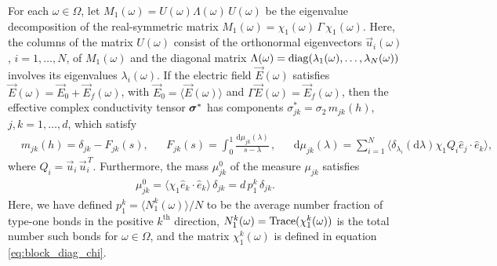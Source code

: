 \documentclass{cmslatex}
\renewcommand{\d}{\text{d}}
\newcommand\bsig{\mbox{\boldmath${\sigma}$}}
\begin{document}
\vspace{0.15in}
% 
\begin{theorem}\label{thm:Discrete_Spectral_Theorem_ACM}
  For each $\omega\in\Omega$, let $M_1(\omega)=U(\omega)\Lambda(\omega)\,U(\omega)$ be the eigenvalue
  decomposition of the real-symmetric matrix
  $M_1(\omega)=\chi_1(\omega)\,\Gamma\,\chi_1(\omega)$. Here, the columns of the matrix $U(\omega)$
  consist of the orthonormal eigenvectors $\vec{u}_i(\omega)$, $i=1,\ldots,N$,
  of $M_1(\omega)$ and the diagonal matrix $\Lambda(\omega)={\rm diag}(\lambda_1(\omega),\ldots,\lambda_N(\omega))$
  involves its eigenvalues $\lambda_i(\omega)$. If the electric field
  $\vec{E}(\omega)$ satisfies $\vec{E}(\omega)=\vec{E}_0+\vec{E}_f(\omega)$, with
  $\vec{E}_0=\langle\vec{E}(\omega)\rangle$ and $\Gamma\vec{E}(\omega)=\vec{E}_f(\omega)$, then the
  effective complex conductivity tensor $\bsig^*$ has components
  $\sigma_{jk}^*=\sigma_2\,m_{jk}(h)$, $j,k=1,\ldots,d$,  which satisfy       
%
\begin{align}\label{eq:Stieltjes_F_Discrete}
  &m_{jk}(h)=\delta_{jk}-F_{jk}(s), 
  &&F_{jk}(s)=\int_0^1\frac{\d\mu_{jk}(\lambda)}{s-\lambda}\,, 
  &&\d\mu_{jk}(\lambda)=\sum_{i=1}^N\langle \delta_{\lambda_i}(\d\lambda)\chi_1Q_i\hat{e}_j\cdot\hat{e}_k\rangle,  
\end{align}
%
where $Q_i=\vec{u}_i\,\vec{u}_i^{\,T}$. Furthermore, the mass $\mu_{jk}^0$ of the
measure $\mu_{jk}$ satisfies 
%
\begin{align}\label{eq:Measure_Mass_theorem}
  \mu_{jk}^0=\langle\chi_1\hat{e}_k\cdot\hat{e}_k\rangle\,\delta_{jk}
       =d\,p_1^k\,\delta_{jk}.
\end{align}
%
Here, we have defined $p_1^k=\langle N_1^k(\omega)\rangle/N$ to be the average number
fraction of type-one bonds in the positive $k^{\text{th}}$ direction,
$N_1^k(\omega)={\rm Trace}(\chi_1^k(\omega))$ is the total number such bonds for
$\omega\in\Omega$, and the matrix $\chi_1^k(\omega)$ is defined in equation
\eqref{eq:block_diag_chi}.  
% 
\end{theorem}
\end{document}
